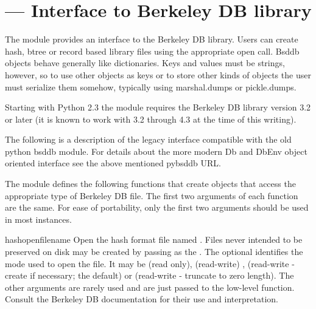 \section{ ---
         Interface to Berkeley DB library}



The  module provides an interface to the Berkeley DB
library.  Users can create hash, btree or record based library files
using the appropriate open call. Bsddb objects behave generally like
dictionaries.  Keys and values must be strings, however, so to use
other objects as keys or to store other kinds of objects the user must
serialize them somehow, typically using marshal.dumps or pickle.dumps.

Starting with Python 2.3 the  module requires the
Berkeley DB library version 3.2 or later (it is known to work with 3.2
through 4.3 at the time of this writing).

\begin{seealso}
\end{seealso}

The following is a description of the legacy  interface
compatible with the old python bsddb module.  For details about the more
modern Db and DbEnv object oriented interface see the above mentioned
pybsddb URL.

The  module defines the following functions that create
objects that access the appropriate type of Berkeley DB file.  The
first two arguments of each function are the same.  For ease of
portability, only the first two arguments should be used in most
instances.

\begin{funcdesc}{hashopen}{filename}
Open the hash format file named .  Files never intended
to be preserved on disk may be created by passing  as the 
.  The optional
 identifies the mode used to open the file.  It may be
 (read only),  (read-write) ,
 (read-write - create if necessary; the default) or
 (read-write - truncate to zero length).  The other
arguments are rarely used and are just passed to the low-level
 function.  Consult the Berkeley DB documentation
for their use and interpretation.
\end{funcdesc}

